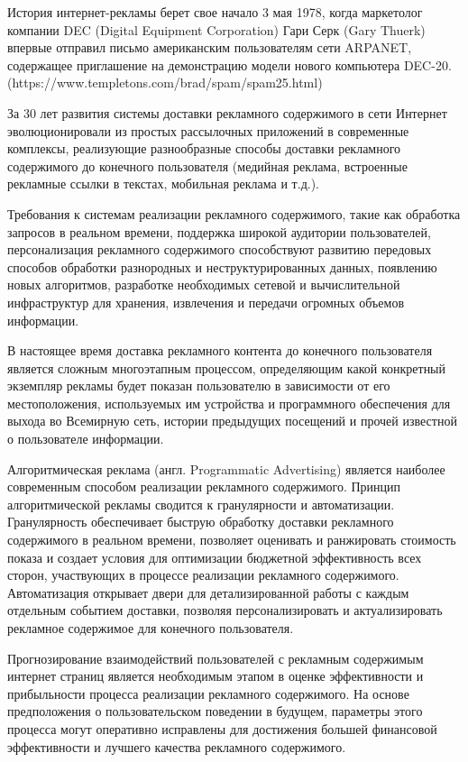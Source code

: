 
История интернет-рекламы берет свое начало 3 мая 1978, когда маркетолог компании DEC (Digital Equipment Corporation) 
Гари Серк (Gary Thuerk) впервые отправил письмо американским пользователям сети ARPANET, содержащее приглашение
на демонстрацию модели нового компьютера DEC-20. (https://www.templetons.com/brad/spam/spam25.html)

За 30 лет развития системы доставки рекламного содержимого в сети Интернет эволюционировали из простых рассылочных
приложений в современные комплексы, реализующие разнообразные способы доставки рекламного содержимого до 
конечного пользователя (медийная реклама, встроенные рекламные ссылки в текстах, мобильная реклама и т.д.).

Требования к системам реализации рекламного содержимого, такие как обработка запросов в реальном времени, 
поддержка широкой аудитории пользователей, персонализация рекламного содержимого способствуют развитию
передовых способов обработки разнородных и неструктурированных данных, появлению новых алгоритмов, разработке
необходимых сетевой и вычислительной инфраструктур для хранения, извлечения и передачи огромных объемов информации.

В настоящее время доставка рекламного контента до конечного пользователя является сложным многоэтапным процессом, 
определяющим какой конкретный экземпляр рекламы будет показан пользователю в зависимости от его местоположения,
используемых им устройства и программного обеспечения для выхода во Всемирную сеть, истории предыдущих
посещений и прочей известной о пользователе информации.

Алгоритмическая реклама (англ. Programmatic Advertising) является наиболее современным способом реализации 
рекламного содержимого. Принцип алгоритмической рекламы сводится к гранулярности и автоматизации. Гранулярность
обеспечивает быструю обработку доставки рекламного содержимого в реальном времени, позволяет оценивать и ранжировать
стоимость показа и создает условия для оптимизации бюджетной эффективность всех сторон, участвующих в процессе 
реализации рекламного содержимого. Автоматизация открывает двери для детализированной работы с каждым отдельным событием доставки,
позволяя персонализировать и актуализировать рекламное содержимое для конечного пользователя.

Прогнозирование взаимодействий пользователей с рекламным содержимым интернет страниц является необходимым этапом
в оценке эффективности и прибыльности процесса реализации рекламного содержимого. На основе предположения о 
пользовательском поведении в будущем, параметры этого процесса могут оперативно исправлены для достижения большей
финансовой эффективности и лучшего качества рекламного содержимого.

